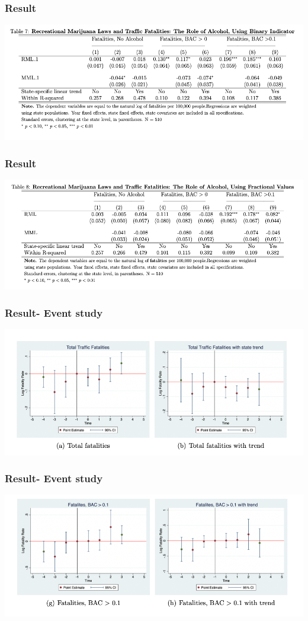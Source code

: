 \documentclass{beamer}
\begin{document}
\begin{frame} %
\frametitle{Result}
	
	\includegraphics[scale = 0.33]{table7}
	
\end{frame}

\begin{frame} %
\frametitle{Result}
	
	\includegraphics[scale = 0.33]{table8}
	
\end{frame}

\begin{frame} %
\frametitle{Result- Event study}
	
	\includegraphics[scale = 0.33]{event1}
	
\end{frame}

\begin{frame} %
\frametitle{Result- Event study}
	
	\includegraphics[scale = 0.33]{event2}
	
\end{frame}
\end{document}
